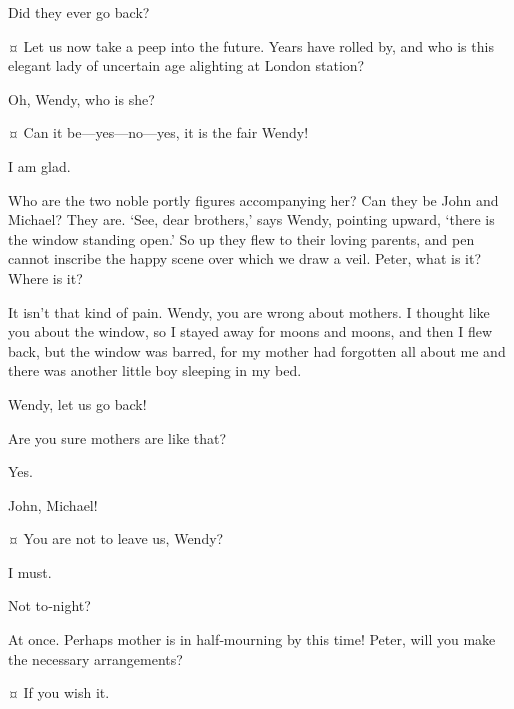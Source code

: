 \begin{drama}

\firsttwinspeaks
Did they ever go back?

\wendyspeaks {}¤
Let us now take a peep into the future.
Years have rolled by, and who is this elegant lady of uncertain age alighting at London station?


\nibsspeaks
Oh, Wendy, who is she?

\wendyspeaks {}¤
Can it be—yes—no—yes, it is the fair Wendy!

\tootlesspeaks
I am glad.

\wendyspeaks
Who are the two noble portly figures accompanying her?
Can they be John and Michael?
They are.
‘See, dear brothers,’ says Wendy, pointing upward, ‘there is the window standing open.’
So up they flew to their loving parents, and pen cannot inscribe the happy scene over which we draw a veil.
Peter, what is it?
Where is it?

\peterspeaks
It isn’t that kind of pain.
Wendy, you are wrong about mothers.
I thought like you about the window, so I stayed away for moons and moons,
and then I flew back, but the window was barred,
for my mother had forgotten all about me and there was another little boy sleeping in my bed.


\johnspeaks
Wendy, let us go back!

\wendyspeaks
Are you sure mothers are like that?

\peterspeaks
Yes.

\wendyspeaks
John, Michael!

\firsttwinspeaks {}¤
You are not to leave us, Wendy?

\wendyspeaks
I must.

\nibsspeaks
Not to‐night?

\wendyspeaks
At once.
Perhaps mother is in half‐mourning by this time!
Peter, will you make the necessary arrangements?


\peterspeaks {}¤
If you wish it.


\end{drama}
